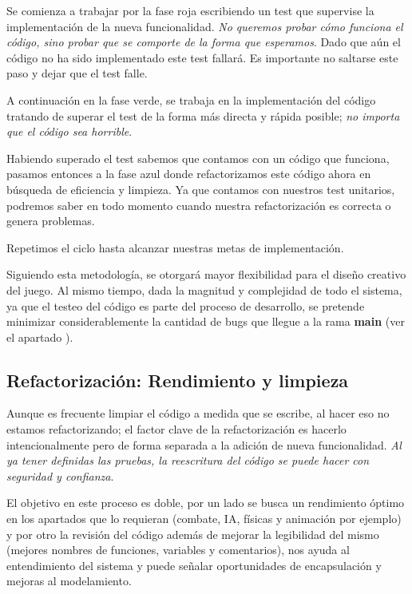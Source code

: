Se comienza a trabajar por la fase roja escribiendo un test que supervise la
implementación de la nueva funcionalidad. \emph{No queremos probar cómo
funciona el código, sino probar que se comporte de la forma que esperamos}.
Dado que aún el código no ha sido implementado este test fallará. Es importante
no saltarse este paso y dejar que el test falle.

A continuación en la fase verde, se trabaja en la implementación del código
tratando de superar el test de la forma más directa y rápida posible;
\textit{no importa que el código sea horrible}.

Habiendo superado el test sabemos que contamos con un código que funciona,
pasamos entonces a la fase azul donde refactorizamos este código ahora en
búsqueda de eficiencia y limpieza. Ya que contamos con nuestros test unitarios,
podremos saber en todo momento cuando nuestra refactorización es correcta o
genera problemas.

Repetimos el ciclo hasta alcanzar nuestras metas de implementación.

Siguiendo esta metodología, se otorgará mayor flexibilidad para el diseño
creativo del juego. Al mismo tiempo, dada la magnitud y complejidad de todo el
sistema, ya que el testeo del código es parte del proceso de desarrollo, se
pretende minimizar considerablemente la cantidad de bugs que llegue a la rama
\textbf{main} (ver el apartado ).

\subsection{Refactorización: Rendimiento y
limpieza}\label{principios:refactorizacion-rendimiento-limpieza} Aunque es
frecuente limpiar el código a medida que se escribe, al hacer eso no estamos
refactorizando; el factor clave de la refactorización es hacerlo
intencionalmente pero de forma separada a la adición de nueva funcionalidad.
\emph{Al ya tener definidas las pruebas, la reescritura del código se puede
hacer con seguridad y confianza}.

El objetivo en este proceso es doble, por un lado se busca un rendimiento
óptimo en los apartados que lo requieran (combate, IA, físicas y animación por
ejemplo) y por otro la revisión del código además de mejorar la legibilidad del
mismo (mejores nombres de funciones, variables y comentarios), nos ayuda al
entendimiento del sistema y puede señalar oportunidades de encapsulación y
mejoras al modelamiento.

